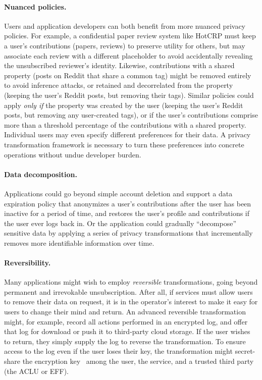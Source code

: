 \paragraph{Nuanced policies.}
%
Users and application developers can both benefit from more nuanced privacy policies.
%
For example, a confidential paper review system like HotCRP must keep a user's contributions
(papers, reviews) to preserve utility for others, but may associate each review with a different
placeholder to avoid accidentally revealing the unsubscribed reviewer's identity.
%
Likewise, contributions with a shared property (\eg posts on Reddit that share a common tag)
might be removed entirely to avoid inference attacks, or retained and decorrelated from the
property (\eg keeping the user's Reddit posts, but removing their tags).
%
Similar policies could apply \emph{only if} the property was created by the user (\eg keeping
the user's Reddit posts, but removing any user-created tags), or if the user's contributions
comprise more than a threshold percentage of the contributions with a shared property.
%
Individual users may even specify different preferences for their data.
%
A privacy transformation framework is necessary to turn these preferences into concrete
operations without undue developer burden.
%

\paragraph{Data decomposition.}
%
Applications could go beyond simple account deletion and support a data expiration policy that
anonymizes a user's contributions after the user has been inactive for a period of time, and
restores the user's profile and contributions if the user ever logs back in.
%
Or the application could gradually ``decompose'' sensitive data by applying a series of
privacy transformations that incrementally removes more identifiable information over time.
%

\paragraph{Reversibility.}
%
Many applications might wish to employ \emph{reversible} transformations, going beyond permanent
and irrevokable unsubscription.
%
After all, if services must allow users to remove their data on request, it is in the operator's
interest to make it easy for users to change their mind and return.
%
An advanced reversible transformation might, for example, record all actions performed in an
encrypted log, and offer that log for download or push it to third-party cloud storage.
%
If the user wishes to return, they simply supply the log to reverse the transformation.
%
To ensure access to the log even if the user loses their key, the transformation might
secret-share the encryption key~\cite{secretsharing} among the user, the service, and a trusted
third party (\eg the ACLU or EFF).
%
